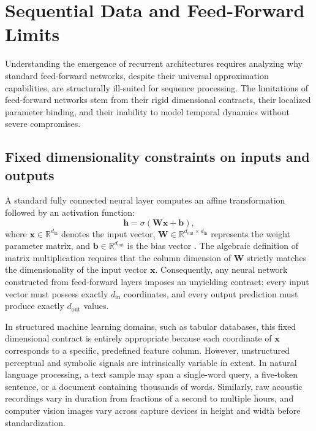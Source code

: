\documentclass[../../main.tex]{subfiles}
\begin{document}
\clearpage
\section{Sequential Data and Feed-Forward Limits}
\label{sec:rnn_limitations_fcn}

Understanding the emergence of recurrent architectures requires analyzing why standard feed-forward networks, despite their universal approximation capabilities, are structurally ill-suited for sequence processing. The limitations of feed-forward networks stem from their rigid dimensional contracts, their localized parameter binding, and their inability to model temporal dynamics without severe compromises.

\subsection{Fixed dimensionality constraints on inputs and outputs}
\label{subsec:rnn_fixed_dimensions}

A standard fully connected neural layer computes an affine transformation followed by an activation function:
\begin{equation}
\mathbf{h} = \sigma\left(\mathbf{W} \mathbf{x} + \mathbf{b}\right),
\label{eq:fcn_layer_definition}
\end{equation}
where $\mathbf{x} \in \mathbb{R}^{d_{\text{in}}}$ denotes the input vector, $\mathbf{W} \in \mathbb{R}^{d_{\text{out}} \times d_{\text{in}}}$ represents the weight parameter matrix, and $\mathbf{b} \in \mathbb{R}^{d_{\text{out}}}$ is the bias vector \citep{goodfellow2016}. The algebraic definition of matrix multiplication requires that the column dimension of $\mathbf{W}$ strictly matches the dimensionality of the input vector $\mathbf{x}$. Consequently, any neural network constructed from feed-forward layers imposes an unyielding contract: every input vector must possess exactly $d_{\text{in}}$ coordinates, and every output prediction must produce exactly $d_{\text{out}}$ values.

In structured machine learning domains, such as tabular databases, this fixed dimensional contract is entirely appropriate because each coordinate of $\mathbf{x}$ corresponds to a specific, predefined feature column. However, unstructured perceptual and symbolic signals are intrinsically variable in extent. In natural language processing, a text sample may span a single-word query, a five-token sentence, or a document containing thousands of words. Similarly, raw acoustic recordings vary in duration from fractions of a second to multiple hours, and computer vision images vary across capture devices in height and width before standardization.
\end{document}
